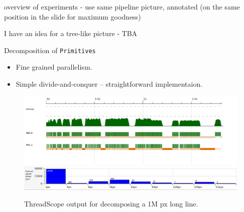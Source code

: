 \documentclass[slidestop,compress,mathserif, xcolor=table]{beamer}
\begin{document}
\begin{frame}

  
    overview of experiments - use same pipeline picture, annotated (on the same position in the slide for maximum goodness)

I have an idea for a tree-like picture - TBA

\end{frame}
\begin{frame}[c]{Decomposition of \texttt{Primitives}}
  \begin{itemize}
  \item Fine grained parallelism.
  \item Simple divide-and-conquer -- straightforward implementaion.
  \end{itemize}
  \begin{figure}[h!]
    \centering
    \includegraphics[width=0.75\linewidth]{../threadscope/lines/single-line-every-10}
    \includegraphics[width=0.4\linewidth]{../threadscope/lines/single-line-every-10-spark-times}
    \caption{ThreadScope output for decomposing a 1M px long line.}
  \label{fig:line-thread-sparks}

\end{figure}
\end{frame}
\end{document}
